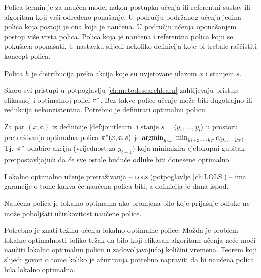 Polica  termin je za naučen model nakon postupka učenja ili
referentni sustav ili algoritam koji vrši određeno ponašanje. U području
podržanog učenja jedina polica koja postoji je ona koja je naučena. U području
učenja oponašanjem  postoji više vrsta polica. Polica
koja je naučena i referentna polica koju se pokušava oponašati. U nastavku
slijedi nekoliko definicija koje bi trebale raščistiti koncept polica.

\begin{definition}[Polica]

  Polica $h$ je distribucija preko akcija koje su uvjetovane ulazom $x$ i
  stanjem $s$.

\end{definition}

\noindent
Skoro svi pristupi u potpoglavlju \ref{ch:metodesearchlearn} zahtijevaju pristup
efikasnoj i optimalnoj polici $\pi\ssymbol{1}$. Bez takve police učenje može
biti dugotrajno ili redukcija nekonzistentna. Potrebno je definirati optimalnu
policu.

\begin{definition}

  Za par $(x, \mathbf{c})$ iz definicije \ref{def:jointlearn} i stanje $s =
  \langle y_1, \ldots, y_t \rangle$ u prostoru pretraživanja optimalna polica
  $\pi\ssymbol{1}(x, \mathbf{c}, s)$ je $\operatorname*{argmin}_{y_{t+1}} \min_{y_{t+2},
  \ldots, y_T} c_{\langle y_1, \ldots, y_T \rangle}$. Tj.~$\pi\ssymbol{1}$
  odabire akciju (vrijednost za $y_{t+1}$) koja minimizira cjelokupni gubitak
  pretpostavljajući da će sve ostale buduće odluke biti donesene optimalno.

\end{definition}

\noindent
Lokalno optimalno učenje pretraživanja -- \textsc{lols} (potpoglavlje
\ref{ch:LOLS}) --  ima garancije o tome kakva će naučena polica biti, a
definicija je dana ispod.

\begin{definition}

  Naučena polica je lokalno optimalna ako promjena bilo koje prijašnje odluke ne
  može poboljšati učinkovitost naučene police.

\end{definition}

\noindent
Potrebno je znati težinu učenja lokalno optimalne police. Možda je problem
lokalne optimalnosti toliko težak da bilo koji efikasan algoritam učenja neće
moći naučiti lokalno optimalnu policu u zadovoljavajućoj količini vremena.
Teorem koji slijedi govori o tome koliko je ažuriranja potrebno napraviti da bi
naučena polica bila lokalno optimalna.

